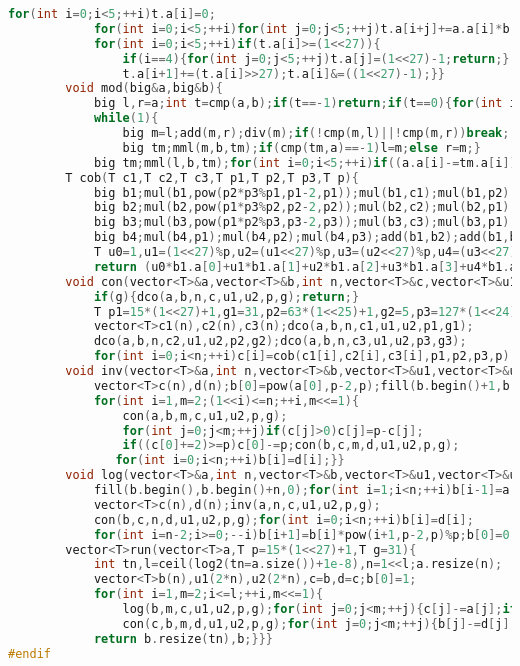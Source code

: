 \documentclass{book}
\begin{document}
\begin{lstlisting}[language=C++,title={Polynomial Exponential Function (Number Theoretic Transform).hpp (5136 bytes, 80 lines)}]
            for(int i=0;i<5;++i)t.a[i]=0;
            for(int i=0;i<5;++i)for(int j=0;j<5;++j)t.a[i+j]+=a.a[i]*b.a[j];
            for(int i=0;i<5;++i)if(t.a[i]>=(1<<27)){
                if(i==4){for(int j=0;j<5;++j)t.a[j]=(1<<27)-1;return;}
                t.a[i+1]+=(t.a[i]>>27);t.a[i]&=((1<<27)-1);}}
        void mod(big&a,big&b){
            big l,r=a;int t=cmp(a,b);if(t==-1)return;if(t==0){for(int i=0;i<5;++i)a.a[i]=0;return;}
            while(1){
                big m=l;add(m,r);div(m);if(!cmp(m,l)||!cmp(m,r))break;
                big tm;mml(m,b,tm);if(cmp(tm,a)==-1)l=m;else r=m;}
            big tm;mml(l,b,tm);for(int i=0;i<5;++i)if((a.a[i]-=tm.a[i])<0)a.a[i]+=(1<<27),--a.a[i+1];}
        T cob(T c1,T c2,T c3,T p1,T p2,T p3,T p){
            big b1;mul(b1,pow(p2*p3%p1,p1-2,p1));mul(b1,c1);mul(b1,p2);mul(b1,p3);
            big b2;mul(b2,pow(p1*p3%p2,p2-2,p2));mul(b2,c2);mul(b2,p1);mul(b2,p3);
            big b3;mul(b3,pow(p1*p2%p3,p3-2,p3));mul(b3,c3);mul(b3,p1);mul(b3,p2);
            big b4;mul(b4,p1);mul(b4,p2);mul(b4,p3);add(b1,b2);add(b1,b3);mod(b1,b4);
            T u0=1,u1=(1<<27)%p,u2=(u1<<27)%p,u3=(u2<<27)%p,u4=(u3<<27)%p;
            return (u0*b1.a[0]+u1*b1.a[1]+u2*b1.a[2]+u3*b1.a[3]+u4*b1.a[4])%p;}
        void con(vector<T>&a,vector<T>&b,int n,vector<T>&c,vector<T>&u1,vector<T>&u2,T p,T g){
            if(g){dco(a,b,n,c,u1,u2,p,g);return;}
            T p1=15*(1<<27)+1,g1=31,p2=63*(1<<25)+1,g2=5,p3=127*(1<<24)+1,g3=3;
            vector<T>c1(n),c2(n),c3(n);dco(a,b,n,c1,u1,u2,p1,g1);
            dco(a,b,n,c2,u1,u2,p2,g2);dco(a,b,n,c3,u1,u2,p3,g3);
            for(int i=0;i<n;++i)c[i]=cob(c1[i],c2[i],c3[i],p1,p2,p3,p);}
        void inv(vector<T>&a,int n,vector<T>&b,vector<T>&u1,vector<T>&u2,T p,T g){
            vector<T>c(n),d(n);b[0]=pow(a[0],p-2,p);fill(b.begin()+1,b.begin()+n,0);
            for(int i=1,m=2;(1<<i)<=n;++i,m<<=1){
                con(a,b,m,c,u1,u2,p,g);
                for(int j=0;j<m;++j)if(c[j]>0)c[j]=p-c[j];
                if((c[0]+=2)>=p)c[0]-=p;con(b,c,m,d,u1,u2,p,g);
               for(int i=0;i<n;++i)b[i]=d[i];}}
        void log(vector<T>&a,int n,vector<T>&b,vector<T>&u1,vector<T>&u2,T p,T g){
            fill(b.begin(),b.begin()+n,0);for(int i=1;i<n;++i)b[i-1]=a[i]*i%p;
            vector<T>c(n),d(n);inv(a,n,c,u1,u2,p,g);
            con(b,c,n,d,u1,u2,p,g);for(int i=0;i<n;++i)b[i]=d[i];
            for(int i=n-2;i>=0;--i)b[i+1]=b[i]*pow(i+1,p-2,p)%p;b[0]=0;}
        vector<T>run(vector<T>a,T p=15*(1<<27)+1,T g=31){
            int tn,l=ceil(log2(tn=a.size())+1e-8),n=1<<l;a.resize(n);
            vector<T>b(n),u1(2*n),u2(2*n),c=b,d=c;b[0]=1;
            for(int i=1,m=2;i<=l;++i,m<<=1){
                log(b,m,c,u1,u2,p,g);for(int j=0;j<m;++j){c[j]-=a[j];if(c[j]<0)c[j]+=p;}
                con(c,b,m,d,u1,u2,p,g);for(int j=0;j<m;++j){b[j]-=d[j];if(b[j]<0)b[j]+=p;}}
            return b.resize(tn),b;}}}
#endif\end{lstlisting}
\end{document}
